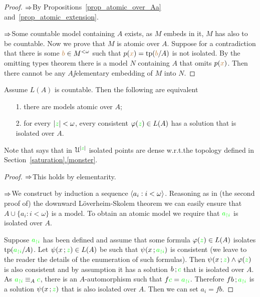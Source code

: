 \documentclass[creche.tex]{subfiles}
\begin{document}
\begin{proof}
$\Rightarrow$\quad By Propositions~\ref{prop_atomic_over_Aa} and~\ref{prop_atomic_extension}.

$\Rightarrow$\quad Some countable model containing $A$ exists, as $M$ embeds in it, $M$ has also to be countable.
Now we prove that $M$ is atomic over $A$.
Suppose for a contradiction that there is some ${\color{brown} b}\in M^{<\omega}$ such that $p({\color{brown} x})={\rm tp}({\color{brown} b}/A)$ is not isolated.
By the omitting types theorem there is a model $N$ containing $A$ that omits $p({\color{brown} x})$.
Then there cannot be any $A\jj$elementary embedding of $M$ into $N$.
\end{proof}

\begin{proposition}\label{prop_idolated_type_dense}
Assume $L(A)$ is countable.
Then the following are equivalent
\begin{itemize}
\item[1.] there are models atomic over $A$;
\item[2.] for every $|{\color{green} z}|<\omega$, every consistent $\varphi({\color{green} z})\in L(A)$ has a solution that is isolated over $A$.
\end{itemize}
\end{proposition} 
Note that  says that in $\EuScript U^{|{\color{green} z}|}$ isolated points are dense w.r.t.\@ the topology defined in Section~\hyperref[saturation]{\ref*{saturation}.\ref*{monster}}.
\begin{proof}
$\Rightarrow$\quad This holds by elementarity.

$\Rightarrow$\quad We construct by induction a sequence $\langle{a_i}:i<\omega\rangle$.
Reasoning as in (the second proof of) the downward L\"overheim-Skolem theorem we can easily ensure that $A\cup\big\{{a_i}:i<\omega\big\}$ is a model.
To obtain an atomic model we require that ${\color{green} a_{\restriction i}}$ is isolated over $A$.


Suppose ${\color{green} a_{\restriction i}}$ has been defined and assume that some formula $\varphi({\color{green} z})\in L(A)$ isolates ${\rm tp}({\color{green} a_{\restriction i}}/A)$.
Let $\psi({x}\,;{\color{green} z})\in L(A)$ be such that $\psi({x}\,;{\color{green} a_{\restriction i}})$ is consistent (we leave to the reader the details of the enumeration of such formulas).
Then $\psi({x}\,;{\color{green} z})\wedge\varphi({\color{green} z})$ is also consistent and by assumption it has a solution ${b}\,;{\color{green} c}$ that is isolated over $A$.
As ${\color{green} a_{\restriction i}}\equiv_A{\color{green} c}$, there is an $A$-automorphism such that $f{\color{green} c}={\color{green} a_{\restriction i}}$.
Therefore $f{b}\,;{\color{green} a_{\restriction i}}$ is a solution $\psi({x}\,;{\color{green} z})$ that is also isolated over $A$.
Then we can set ${a_i}=f{b}$.
\end{proof}
\end{document}

